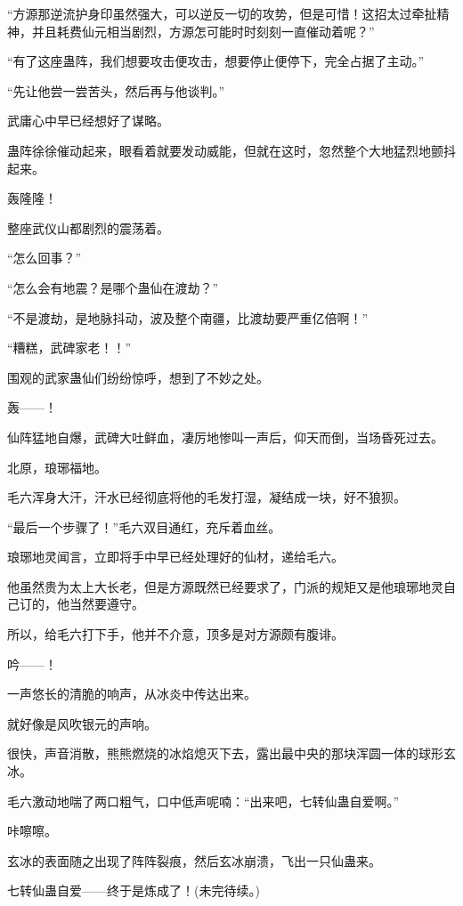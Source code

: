 \begin{this_body}
“方源那逆流护身印虽然强大，可以逆反一切的攻势，但是可惜！这招太过牵扯精神，并且耗费仙元相当剧烈，方源怎可能时时刻刻一直催动着呢？”

“有了这座蛊阵，我们想要攻击便攻击，想要停止便停下，完全占据了主动。”

“先让他尝一尝苦头，然后再与他谈判。”

武庸心中早已经想好了谋略。

蛊阵徐徐催动起来，眼看着就要发动威能，但就在这时，忽然整个大地猛烈地颤抖起来。

轰隆隆！

整座武仪山都剧烈的震荡着。

“怎么回事？”

“怎么会有地震？是哪个蛊仙在渡劫？”

“不是渡劫，是地脉抖动，波及整个南疆，比渡劫要严重亿倍啊！”

“糟糕，武碑家老！！”

围观的武家蛊仙们纷纷惊呼，想到了不妙之处。

轰——！

仙阵猛地自爆，武碑大吐鲜血，凄厉地惨叫一声后，仰天而倒，当场昏死过去。

北原，琅琊福地。

毛六浑身大汗，汗水已经彻底将他的毛发打湿，凝结成一块，好不狼狈。

“最后一个步骤了！”毛六双目通红，充斥着血丝。

琅琊地灵闻言，立即将手中早已经处理好的仙材，递给毛六。

他虽然贵为太上大长老，但是方源既然已经要求了，门派的规矩又是他琅琊地灵自己订的，他当然要遵守。

所以，给毛六打下手，他并不介意，顶多是对方源颇有腹诽。

吟——！

一声悠长的清脆的响声，从冰炎中传达出来。

就好像是风吹银元的声响。

很快，声音消散，熊熊燃烧的冰焰熄灭下去，露出最中央的那块浑圆一体的球形玄冰。

毛六激动地喘了两口粗气，口中低声呢喃：“出来吧，七转仙蛊自爱啊。”

咔嚓嚓。

玄冰的表面随之出现了阵阵裂痕，然后玄冰崩溃，飞出一只仙蛊来。

七转仙蛊自爱——终于是炼成了！(未完待续。)

\end{this_body}

